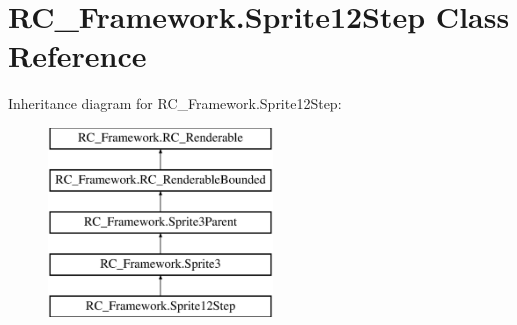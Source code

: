 \hypertarget{class_r_c___framework_1_1_sprite12_step}{}\section{R\+C\+\_\+\+Framework.\+Sprite12\+Step Class Reference}
\label{class_r_c___framework_1_1_sprite12_step}
Inheritance diagram for R\+C\+\_\+\+Framework.\+Sprite12\+Step\+:\begin{figure}[H]
\begin{center}
\leavevmode
\includegraphics[height=5.000000cm]{class_r_c___framework_1_1_sprite12_step}
\end{center}
\end{figure}
